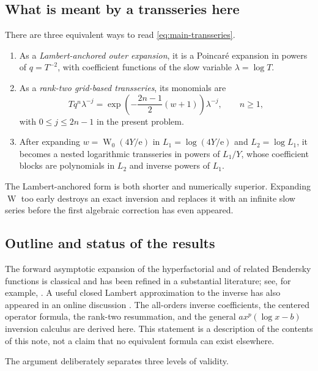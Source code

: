 \documentclass[11pt,oneside]{article}
\theoremstyle{plain}
\theoremstyle{definition}
\theoremstyle{remark}
\newcommand{\W}{\operatorname{W}}
\newcommand{\e}{\mathrm{e}}
\begin{document}
\subsection{What is meant by a transseries here}

There are three equivalent ways to read \cref{eq:main-transseries}.

\begin{enumerate}
\item As a \emph{Lambert-anchored outer expansion}, it is a Poincar\'e expansion
in powers of \(q=T^{-2}\), with coefficient functions of the slow variable
\(\lambda=\log T\).
\item As a \emph{rank-two grid-based transseries}, its monomials are
\begin{equation}
 Tq^n\lambda^{-j}
 =\exp\!\left(-\frac{2n-1}{2}(w+1)\right)\lambda^{-j},
 \qquad n\ge1,
 \label{eq:rank-two-monomials}
\end{equation}
with \(0\le j\le2n-1\) in the present problem.
\item After expanding \(w=\W_0(4Y/\e)\) in
\(L_1=\log(4Y/\e)\) and \(L_2=\log L_1\), it becomes a nested
logarithmic transseries in powers of \(L_1/Y\), whose coefficient blocks are
polynomials in \(L_2\) and inverse powers of \(L_1\).
\end{enumerate}

The Lambert-anchored form is both shorter and numerically superior.  Expanding
\(\W\) too early destroys an exact inversion and replaces it with an infinite
slow series before the first algebraic correction has even appeared.

\subsection{Outline and status of the results}

The forward asymptotic expansion of the hyperfactorial and of related
Bendersky functions is classical and has been refined in a substantial
literature; see, for example,
\cite{Bendersky1933,WangLiu2016,Wang2017,Xu2020}.  A useful closed Lambert
approximation to the inverse has also appeared in an online discussion
\cite{MathSEHyperfactorial}.  The all-orders inverse coefficients, the centered
operator formula, the rank-two resummation, and the general
\(a x^p(\log x-b)\) inversion calculus are derived here.  This statement is a
description of the contents of this note, not a claim that no equivalent
formula can exist elsewhere.

The argument deliberately separates three levels of validity.
\end{document}
